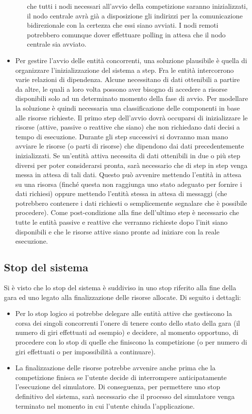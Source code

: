 \begin{itemize}
\begin{itemize}
che tutti i nodi necessari all'avvio della competizione saranno inizializzati,
il nodo centrale avrà già a disposizione gli indirizzi per la comunicazione
bidirezionale con la certezza che essi siano avviati. I nodi remoti potrebbero
comunque dover effettuare polling in attesa che il nodo centrale sia avviato.
\end{itemize}
\item Per gestire l'avvio delle entità concorrenti, una soluzione plausibile è
quella di organizzare l'inizializzazione del sistema a step.
Fra le entità intercorrono varie relazioni di dipendenza. Alcune necessitano di
dati ottenibili a partire da altre, le quali a loro volta
possono aver bisogno di accedere a risorse disponibili solo ad un determinato
momento della fase di avvio. Per modellare la soluzione
è quindi necessaria una classificazione delle componenti in base alle risorse
richieste. Il primo step dell'avvio dovrà occuparsi di inizializzare
le risorse (attive, passive o reattive che siano) che non richiedano dati
decisi a tempo di esecuzione. Durante gli step successivi
si dovranno man mano avviare le risorse (o parti di risorse) che dipendono dai
dati precedentemente inizializzati. Se un'entità attiva necessita
di dati ottenibili in due o più step diversi per poter considerarsi pronta, sarà
necessario che di step in step venga messa in attesa di tali dati.
Questo può avvenire mettendo l'entità in attesa su una risorsa (finché questa
non raggiunga uno stato adeguato per fornire i dati richiesi)
oppure mettendo l'entità stessa in attesa di messaggi (che potrebbero contenere
i dati richiesti o semplicemente segnalare che è possibile
procedere). Come post-condizione alla fine dell'ultimo step è necessario che
tutte le entità passive e reattive che verranno richieste dopo l'init
siano disponibili e che le risorse attive siano pronte ad iniziare con la reale
esecuzione.
\end{itemize}
\subsection{Stop del sistema}
Si è visto che lo stop del sistema è suddiviso in uno stop riferito alla fine
della gara ed uno legato alla finalizzazione delle risorse allocate.
Di seguito i dettagli:
\begin{itemize}
\item Per lo stop logico si potrebbe delegare alle entità attive che gestiscono
la corsa dei singoli concorrenti l'onere di tenere conto 
dello stato della gara (il numero di giri effettuati ad esempio) e decidere, al
momento opportuno, di procedere con lo stop di quelle che
finiscono la competizione (o per numero di giri effettuati o per impossibilità a
continuare).
\item La finalizzazione delle risorse potrebbe avvenire anche prima che la
competizione finisca se l'utente decide di interrompere anticipatamente
l'esecuzione del simulatore. Di conseguenza, per permettere uno stop definitivo
del sistema, sarà necessario che il processo del simulatore
venga terminato nel momento in cui l'utente chiuda l'applicazione.
\end{itemize}